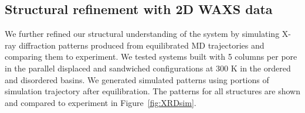 \documentclass[journal=jpcbfk,manusciprt=article]{achemso}
\begin{document}
  \subsection{Structural refinement with 2D WAXS data}
  
  We further refined our structural understanding of the system by simulating X-ray 
  diffraction patterns produced from equilibrated MD trajectories and comparing them
  to experiment. We tested systems built with 5 columns per pore in the parallel 
  displaced and sandwiched configurations at 300 K in the ordered and disordered
  basins. We generated simulated patterns using portions of simulation trajectory after
  equilibration. The patterns for all structures are shown and compared to experiment
  in Figure~\ref{fig:XRDsim}.

\end{document}
